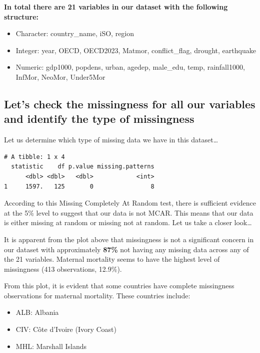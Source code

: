 \documentclass[
  letterpaper,
  DIV=11,
  numbers=noendperiod]{scrartcl}
\begin{document}
\textbf{In total there are 21 variables in our dataset with the
following structure:}

\begin{itemize}
\item
  Character: country\_name, iSO, region
\item
  Integer: year, OECD, OECD2023, Matmor, conflict\_flag, drought,
  earthquake
\item
  Numeric: gdp1000, popdens, urban, agedep, male\_edu, temp,
  rainfall1000, InfMor, NeoMor, Under5Mor
\end{itemize}

\subsection{Let's check the missingness for all our variables and
identify the type of
missingness}\label{lets-check-the-missingness-for-all-our-variables-and-identify-the-type-of-missingness}

Let us determine which type of missing data we have in this
dataset\ldots{}

\begin{verbatim}
# A tibble: 1 x 4
  statistic    df p.value missing.patterns
      <dbl> <dbl>   <dbl>            <int>
1     1597.   125       0                8
\end{verbatim}

According to this Missing Completely At Random test, there is sufficient
evidence at the 5\% level to suggest that our data is not MCAR. This
means that our data is either missing at random or missing not at
random. Let us take a closer look\ldots{}

It is apparent from the plot above that missingness is not a significant
concern in our dataset with approximately \textbf{87\%} not having any
missing data across any of the 21 variables. Maternal mortality seems to
have the highest level of missingness (413 observations, 12.9\%).

From this plot, it is evident that some countries have complete
missingness observations for maternal mortality. These countries
include:

\begin{itemize}
\item
  ALB: Albania
\item
  CIV: Côte d'Ivoire (Ivory Coast)
\item
  MHL: Marshall Islands
\end{itemize}
\end{document}
